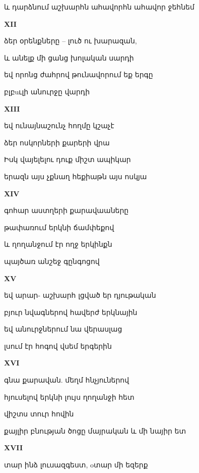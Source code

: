 և դարձնում  աշխարհն ահավորհն ահավոր  ջեհնեմ
       

\centerline{\bf XII}


ձեր օրենքները -- լուծ ու խարազան,


և անելք մի ցանց խոլական սարդի


եվ որոնց  ժահրով թունավորում   եք  երգը 



բլբuւլի անուրջը վարդի




\centerline{\bf  XIII   }

եվ  ունայնաշունչ հողմը կշաչէ


ձեր ոսկորների քարերի վրա


Իսկ վայելելու դուք միշտ ապիկար


երազն այս չքնաղ հեքիաթն այս ոսկյա



\centerline{\bf    XIV           }



գոհար աստղերի քարավաաները 


 թափառում երկնի ճամփեքով



և ղողանջում էր ողջ երկինքն


պայծառ անշեջ  գընգոցով





\centerline{\bf   XV }   


եվ արար- աշխարհ լցված եր դյութական 
                       


բյուր նվագներով հավերժ երկնային


եվ անուրջներում նա վերասլաց 



լսում էր հոգով վսեմ երգերին 


\centerline    {\bf  XVI}


գնա քարավան. մեղմ հնչյուներով



հյուսելով երկնի լույս ղողանջի հետ



վիշտս տուր հովին 



քայլիր բնության ծոցը մայրական   և մի նայիր ետ



\centerline {\bf   XVII}



տար ինձ  լուսազգեստ,   oտար մի եզերք

